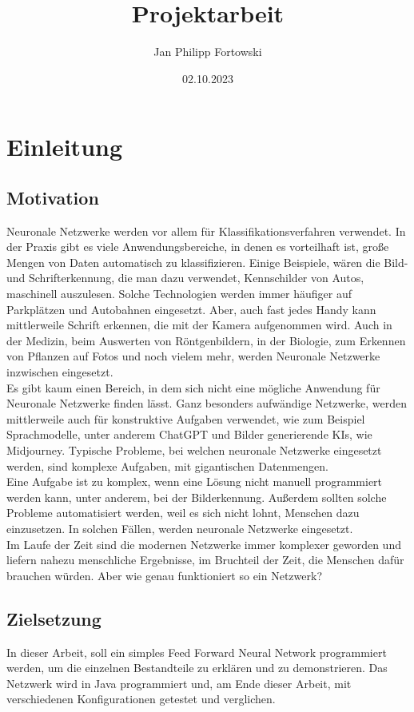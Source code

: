 \documentclass[12pt]{article}
\title{\textbf{Projektarbeit}}
\author{Jan Philipp Fortowski}
\date{02.10.2023}
\begin{document}
\maketitle
\cleardoublepage
\tableofcontents
\cleardoublepage
\thispagestyle{empty}

\section{Einleitung}
\subsection{Motivation}
Neuronale Netzwerke werden vor allem für Klassifikationsverfahren verwendet. In der Praxis gibt es viele Anwendungsbereiche, in denen es vorteilhaft ist, große Mengen von Daten automatisch zu klassifizieren. Einige Beispiele, wären die Bild- und Schrifterkennung, die man dazu verwendet, Kennschilder von Autos, maschinell auszulesen. Solche Technologien werden immer häufiger auf Parkplätzen und Autobahnen eingesetzt. Aber, auch fast jedes Handy kann mittlerweile Schrift erkennen, die mit der Kamera aufgenommen wird. Auch in der Medizin, beim Auswerten von Röntgenbildern, in der Biologie, zum Erkennen von Pflanzen auf Fotos und noch vielem mehr, werden Neuronale Netzwerke inzwischen eingesetzt.\\
Es gibt kaum einen Bereich, in dem sich nicht eine mögliche Anwendung für Neuronale Netzwerke finden lässt. Ganz besonders aufwändige Netzwerke, werden mittlerweile auch für konstruktive Aufgaben verwendet, wie zum Beispiel Sprachmodelle, unter anderem ChatGPT und Bilder generierende KIs, wie Midjourney.
Typische Probleme, bei welchen neuronale Netzwerke eingesetzt werden, sind komplexe Aufgaben, mit gigantischen Datenmengen.\\
Eine Aufgabe ist zu komplex, wenn eine Lösung nicht manuell programmiert werden kann, unter anderem, bei der Bilderkennung. Außerdem sollten solche Probleme automatisiert werden, weil es sich nicht lohnt, Menschen dazu einzusetzen. 
In solchen Fällen, werden neuronale Netzwerke eingesetzt.\\
Im Laufe der Zeit sind die modernen Netzwerke immer komplexer geworden und liefern nahezu menschliche Ergebnisse, im Bruchteil der Zeit, die Menschen dafür brauchen würden. Aber wie genau funktioniert so ein Netzwerk?
\subsection{Zielsetzung}
In dieser Arbeit, soll ein simples Feed Forward Neural Network programmiert werden, um die einzelnen Bestandteile zu erklären und zu demonstrieren. Das Netzwerk wird in Java programmiert und, am Ende dieser Arbeit, mit verschiedenen Konfigurationen getestet und verglichen.
\end{document}
